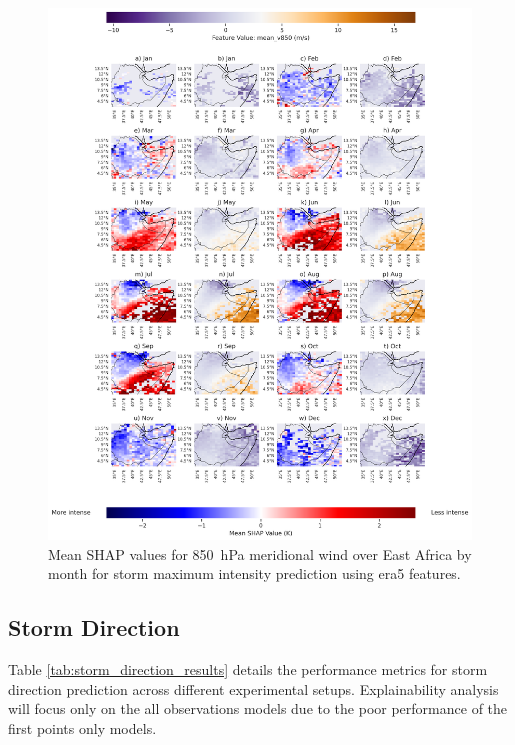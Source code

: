 \begin{figure}[ht]
    \centering
    \includegraphics[width=\textwidth]{../figures/generated/experiments/storm_max_intensity/geographic_corr/storm_max_intensity_era5_shap_mean_v850_map_by_month.png}
    \caption{Mean SHAP values for \SI{850}{\hecto\pascal} meridional wind over East Africa by month for storm maximum intensity prediction using \acrshort{era5} features.}
    \label{fig:storm_max_intensity_era5_shap_mean_v850_map_by_month}
\end{figure}

\clearpage
\subsection{Storm Direction}

Table \ref{tab:storm_direction_results} details the performance metrics for storm direction prediction across different experimental setups. Explainability analysis will focus only on the all observations models due to the poor performance of the first points only models.

